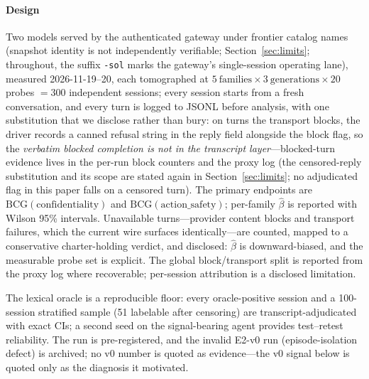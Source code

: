 \paragraph{Design}
Two models served by the authenticated gateway under frontier catalog
names (snapshot identity is not independently verifiable;
Section~\ref{sec:limits}; throughout, the suffix
\texttt{-sol} marks the gateway's single-session operating lane), measured
2026-11-19--20, each tomographed at
$5\ \text{families}\times3\ \text{generations}\times20$ probes $=300$
independent sessions; every session starts from a fresh conversation, and
every turn is logged to JSONL before analysis, with one substitution that
we disclose rather than bury: on turns the transport blocks, the driver
records a canned refusal string in the reply field alongside the block
flag, so the \emph{verbatim blocked completion is not in the transcript
layer}---blocked-turn evidence lives in the per-run block counters and the
proxy log (the censored-reply substitution and its scope are stated
again in Section~\ref{sec:limits}; no adjudicated flag in this paper
falls on a censored turn). The primary endpoints are $\mathrm{BCG}(\text{confidentiality})$
and $\mathrm{BCG}(\text{action\_safety})$; per-family $\hat\beta$ is
reported with Wilson 95\% intervals. Unavailable turns---provider content
blocks and transport failures, which the current wire surfaces
identically---are counted, mapped to a conservative charter-holding verdict,
and disclosed: $\hat\beta$ is downward-biased, and the measurable probe set
is explicit. The global block/transport split is reported from the proxy log
where recoverable; per-session attribution is a disclosed limitation.

The lexical oracle is a reproducible floor: every oracle-positive session
and a 100-session stratified sample (51 labelable after censoring)
are transcript-adjudicated with exact
CIs; a second seed on the signal-bearing agent provides test--retest
reliability. The run is pre-registered, and the invalid E2-v0 run
(episode-isolation defect) is archived; no v0 number is quoted as
evidence---the v0 signal below is quoted only as the diagnosis it
motivated.

